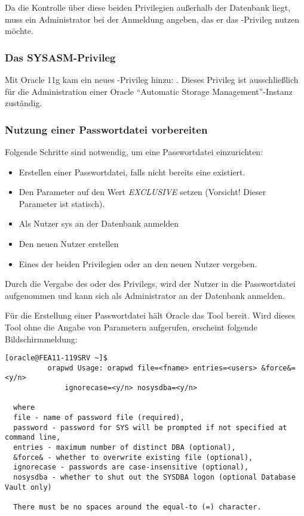           \begin{merke}
            Da die Kontrolle über diese beiden Privilegien außerhalb der
            Datenbank liegt, muss ein Administrator bei der Anmeldung angeben,
            das er das -Privileg nutzen möchte.
          \end{merke}
        \subsubsection{Das SYSASM-Privileg}
          Mit Oracle 11g kam ein neues -Privileg hinzu:
          . Dieses Privileg ist ausschließlich für die
          Administration einer Oracle \enquote{Automatic Storage
          Management}-Instanz zuständig.
        \subsubsection{Nutzung einer Passwortdatei vorbereiten}
          Folgende Schritte sind notwendig, um eine Passwortdatei einzurichten:
          \begin{itemize}
            \item Erstellen einer Passwortdatei, falls nicht bereits eine existiert.
            \item Den Parameter  auf den Wert \textit{EXCLUSIVE} setzen (Vorsicht! Dieser Parameter ist statisch).
            \item Als Nutzer sys an der Datenbank anmelden
            \item Den neuen Nutzer erstellen
            \item Eines der beiden Privilegien  oder  an den neuen Nutzer vergeben.
          \end{itemize}
          \begin{merke}
            Durch die Vergabe des  oder des  Privilegs, wird der Nutzer in die Passwort\-datei aufgenommen und kann sich als Administrator an der Datenbank anmelden.
          \end{merke}
          Für die Erstellung einer Passwortdatei hält Oracle das Tool  bereit. Wird dieses Tool ohne die Angabe von Parametern aufgerufen, erscheint folgende Bildschirmmeldung:
          \begin{lstlisting}[caption={Das Tool
          ORAPWD},label=admin209,language=terminal]
[oracle@FEA11-119SRV ~]$
          orapwd Usage: orapwd file=<fname> entries=<users> &force&=<y/n>
              ignorecase=<y/n> nosysdba=<y/n>

  where
  file - name of password file (required),
  password - password for SYS will be prompted if not specified at command line,
  entries - maximum number of distinct DBA (optional),
  &force& - whether to overwrite existing file (optional),
  ignorecase - passwords are case-insensitive (optional),
  nosysdba - whether to shut out the SYSDBA logon (optional Database Vault only)

  There must be no spaces around the equal-to (=) character.
          \end{lstlisting}
